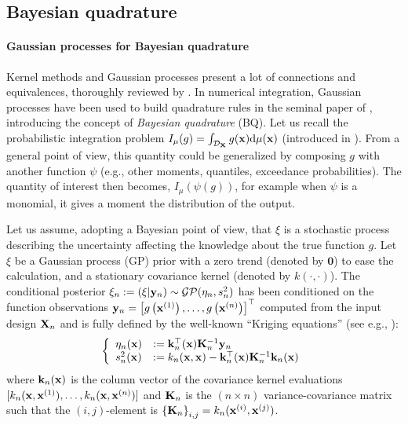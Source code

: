 
\subsection{Bayesian quadrature}
\paragraph{Gaussian processes for Bayesian quadrature}%
Kernel methods and Gaussian processes present a lot of connections and equivalences, thoroughly reviewed by \cite{motonobu_2018}. 
In numerical integration, Gaussian processes have been used to build quadrature rules in the seminal paper of \cite{ohagan_1991}, introducing the concept of \emph{Bayesian quadrature} (BQ). 
Let us recall the probabilistic integration problem $I_\mu(g) = \int_{\mathcal{D}_{\bf X}} g({\bf x}) \mathrm{d} \mu({\bf x})$ (introduced in ). 
From a general point of view, this quantity could be generalized by composing $g$ with another function $\psi$ (e.g., other moments, quantiles, exceedance probabilities). 
The quantity of interest then becomes, $I_\mu(\psi(g))$, for example when $\psi$ is a monomial, it gives a moment the distribution of the output.

Let us assume, adopting a Bayesian point of view, that $\xi$ is a stochastic process describing the uncertainty affecting the knowledge about the true function $g$. 
Let $\xi$ be a Gaussian process (GP) prior with a zero trend (denoted by $\textbf{0}$) to ease the calculation, and a stationary covariance kernel (denoted by $k(\cdot, \cdot)$). 
The conditional posterior $\xi_n := (\xi | {\bf y}_n) \sim \mathcal{GP}(\eta_n, s_n^2)$ has been conditioned on the function observations ${\bf y}_n = \left[g\left({\bf x}^{(1)}\right), \ldots, g\left({\bf x}^{(n)}\right)\right]^\top$ computed from the input design ${\bf X}_n$ and is fully defined by the well-known ``Kriging equations'' (see e.g., \cite{rasmussen_2006}):
\begin{equation}
    \left\{
    \begin{array}{ll}
        \eta_n({\bf x}) &:= {\bf k}_n^\top({\bf x}) {\bf K}_n^{-1} {\bf y}_n\\
        s_n^2({\bf x}) &:= k_n({\bf x}, {\bf x}) - {\bf k}_n^\top({\bf x}) {\bf K}_n^{-1} {\bf k}_n({\bf x})
    \end{array}
\right.
\label{eq:kriging}
\end{equation}
where ${\bf k}_n({\bf x})$ is the column vector of the covariance kernel evaluations $[k_n({\bf x}, {\bf x}^{(1)}), \dots,\allowbreak k_n({\bf x}, {\bf x}^{(n)})]$ and ${\bf K}_n$ is the $(n \times n)$ variance-covariance matrix such that the $(i, j)$-element is $\left\{{\bf K}_n \right\}_{i, j}=k_n({\bf x}^{(i)}, {\bf x}^{(j)})$.

